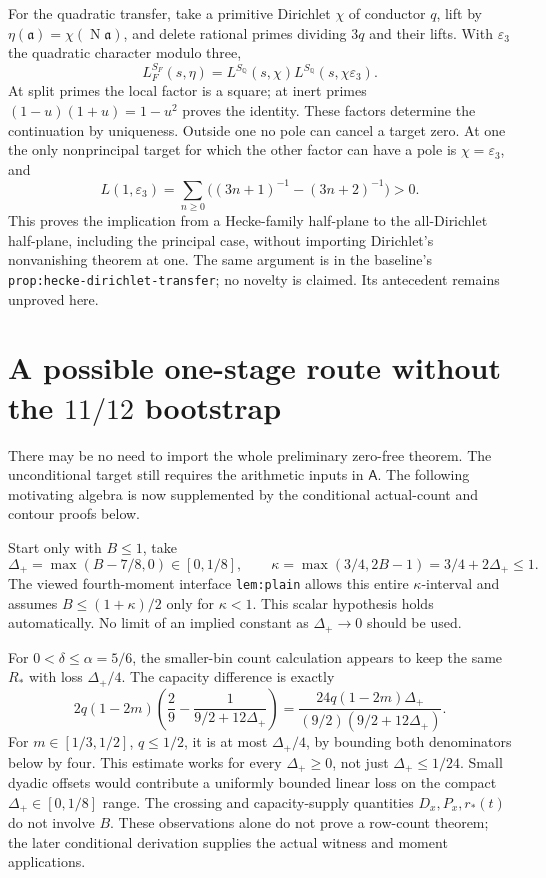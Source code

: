 \documentclass[12pt]{article}
\newcommand{\N}{\operatorname{N}}
\begin{document}
For the quadratic transfer, take a primitive Dirichlet \(\chi\)
of conductor \(q\), lift by \(\eta(\mathfrak a)=\chi(\N\mathfrak a)\),
and delete rational primes dividing \(3q\) and their lifts.
With \(\varepsilon_3\) the quadratic character modulo three,
\[
 L_F^{S_F}(s,\eta)
  =L^{S_{\mathbb Q}}(s,\chi)
      L^{S_{\mathbb Q}}(s,\chi\varepsilon_3).
\]
At split primes the local factor is a square; at inert primes
\((1-u)(1+u)=1-u^2\) proves the identity.  These factors determine
the continuation by uniqueness.  Outside one no pole can cancel
a target zero.  At one the only nonprincipal target for which
the other factor can have a pole is \(\chi=\varepsilon_3\), and
\[
 L(1,\varepsilon_3)
 =\sum_{n\ge0}\bigl((3n+1)^{-1}-(3n+2)^{-1}\bigr)>0.
\]
This proves the implication from a Hecke-family half-plane to
the all-Dirichlet half-plane, including the principal case,
without importing Dirichlet's nonvanishing theorem at one.
The same argument is in the baseline's
\nolinkurl{prop:hecke-dirichlet-transfer}; no novelty is claimed.
Its antecedent remains unproved here.


\section{A possible one-stage route without the \(11/12\) bootstrap}
There may be no need to import the whole preliminary zero-free
theorem.  The unconditional target still requires the arithmetic inputs in
\(\mathsf A\).  The following motivating algebra is now supplemented
by the conditional actual-count and contour proofs below.

Start only with \(B\le1\), take
\[
 \Delta_+=\max(B-7/8,0)\in[0,1/8],\qquad
 \kappa=\max(3/4,2B-1)=3/4+2\Delta_+\le1.
\]
The viewed fourth-moment interface \nolinkurl{lem:plain}
allows this entire \(\kappa\)-interval and assumes
\(B\le(1+\kappa)/2\) only for \(\kappa<1\).  This scalar
hypothesis holds automatically.  No limit of an implied constant
as \(\Delta_+\to0\) should be used.

For \(0<\delta\le\alpha=5/6\), the smaller-bin count calculation
appears to keep the same \(R_\ast\) with loss \(\Delta_+/4\).
The capacity difference is exactly
\[
 2q(1-2m)\left(\frac29-\frac1{9/2+12\Delta_+}\right)
  =\frac{24q(1-2m)\Delta_+}
          {(9/2)(9/2+12\Delta_+)}.
\]
For \(m\in[1/3,1/2]\), \(q\le1/2\), it is at most
\(\Delta_+/4\), by bounding both denominators below by four.
This estimate works for every \(\Delta_+\ge0\), not just
\(\Delta_+\le1/24\).
Small dyadic offsets would contribute a uniformly bounded linear
loss on the compact \(\Delta_+\in[0,1/8]\) range.
The crossing and capacity-supply quantities \(D_x,P_x,r_*(t)\)
do not involve \(B\).
These observations alone do not prove a row-count theorem;
the later conditional derivation supplies the actual witness and
moment applications.
\end{document}
